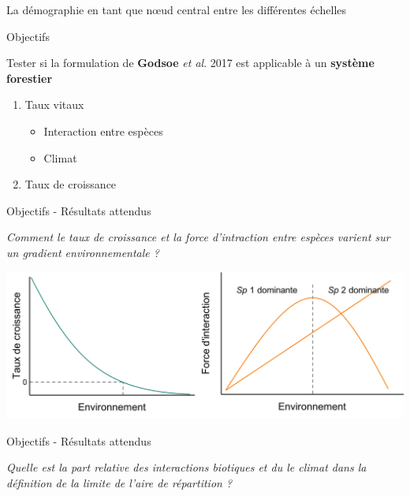 \documentclass[11pt, compress, aspectratio=1610]{beamer}
\providecommand{\tightlist}{%
  \setlength{\itemsep}{0pt}\setlength{\parskip}{0pt}}
\begin{document}
\begin{frame}{La démographie en tant que nœud central entre les
différentes échelles}
\begin{frame}{Objectifs}
\centering

Tester si la formulation de \textbf{Godsoe} \emph{et al}. 2017 est
applicable à un \textbf{système forestier}

\begin{enumerate}
[1.]
\tightlist
\item
  Taux vitaux

  \begin{itemize}
  \tightlist
  \item
    Interaction entre espèces
  \item
    Climat
  \end{itemize}
\item
  Taux de croissance
\end{enumerate}

\end{frame}

\begin{frame}{Objectifs - Résultats attendus}
\protect\hypertarget{objectifs---ruxe9sultats-attendus}{}

\centering

\emph{Comment le taux de croissance et la force d’intraction entre
espèces varient sur un gradient environnementale ?}

\vspace*{10mm}
\centering

\includegraphics[scale=0.45]{figures/output_chap2a.png}

\par

\end{frame}

\begin{frame}{Objectifs - Résultats attendus}
\protect\hypertarget{objectifs---ruxe9sultats-attendus-1}{}

\centering

\emph{Quelle est la part relative des interactions biotiques et du le
climat dans la définition de la limite de l’aire de répartition ?}

\vspace*{10mm}
\centering


\end{frame}
\end{frame}
\end{document}
